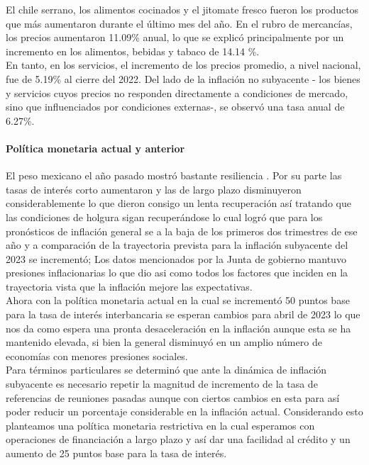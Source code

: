 \documentclass{article}
\theoremstyle{mytheoremstyle}
\theoremstyle{mytheoremstyle}
\theoremstyle{myproblemstyle}
\begin{document}
El chile serrano, los alimentos cocinados y el jitomate fresco fueron los productos que más aumentaron durante el último mes del año. En el rubro de mercancías, los precios aumentaron 11.09\% anual, lo que se explicó principalmente por un incremento en los alimentos, bebidas y tabaco de 14.14 \%.\\

En tanto, en los servicios, el incremento de los precios promedio, a nivel nacional, fue de 5.19\% al cierre del 2022. Del lado de la inflación no subyacente - los bienes y servicios cuyos precios no responden directamente a condiciones de mercado, sino que influenciados por condiciones externas-, se observó una tasa anual de 6.27\%.\\

\paragraph{Política monetaria actual y anterior}

El peso mexicano el año pasado mostró bastante resiliencia . Por su parte las tasas de interés corto aumentaron y las de largo plazo disminuyeron considerablemente lo que dieron consigo un lenta recuperación  así tratando que las condiciones de holgura sigan recuperándose lo cual logró que para los pronósticos de inflación general se a la baja de los primeros dos trimestres de ese año y a comparación de la trayectoria prevista para la inflación subyacente del 2023 se incrementó; Los datos mencionados por la Junta de gobierno mantuvo presiones inflacionarias lo que dio asi como todos los factores que inciden en la trayectoria vista que la inflación mejore las expectativas.\\

Ahora con la política monetaria actual en la cual se incrementó 50 puntos base para la tasa de interés interbancaria se esperan cambios para abril de 2023  lo que nos da como espera una pronta desaceleración en la inflación aunque esta se ha mantenido elevada, si bien la general disminuyó en un amplio número de economías con menores presiones sociales.\\

Para términos particulares se determinó que ante la dinámica de inflación subyacente es necesario repetir la magnitud de incremento de la tasa de referencias de reuniones pasadas aunque con ciertos cambios en esta para así poder reducir un porcentaje considerable en la inflación actual. Considerando esto planteamos una política monetaria restrictiva en la cual esperamos con operaciones de financiación a largo plazo y así dar una facilidad al crédito y un aumento de 25 puntos base para la tasa de interés.\\
\end{document}
